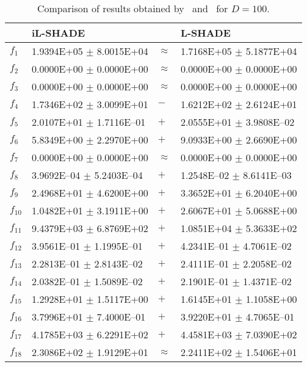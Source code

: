 \begin{table}[ht]
\centering
\caption{Comparison of results obtained by {\sf \ilshade}\ and {\sf \LSHADE}\ for $D=100$.} 
\label{tab:D100}
\begin{tabular}{|l|ll|l|}
  \hline
 & iL-SHADE &  & L-SHADE \\ 
  \hline \hline
$f_{1}$ & 1.9394E+05 $\pm$ 8.0015E+04 & $\approx$ & 1.7168E+05 $\pm$ 5.1877E+04 \\ 
  $f_{2}$ & 0.0000E+00 $\pm$ 0.0000E+00 & $\approx$ & 0.0000E+00 $\pm$ 0.0000E+00 \\ 
  $f_{3}$ & 0.0000E+00 $\pm$ 0.0000E+00 & $\approx$ & 0.0000E+00 $\pm$ 0.0000E+00 \\ 
  $f_{4}$ & 1.7346E+02 $\pm$ 3.0099E+01 & $-$ & 1.6212E+02 $\pm$ 2.6124E+01 \\ 
  $f_{5}$ & 2.0107E+01 $\pm$ 1.7116E--01 & $+$ & 2.0555E+01 $\pm$ 3.9808E--02 \\ 
  $f_{6}$ & 5.8349E+00 $\pm$ 2.2970E+00 & $+$ & 9.0933E+00 $\pm$ 2.6690E+00 \\ 
  $f_{7}$ & 0.0000E+00 $\pm$ 0.0000E+00 & $\approx$ & 0.0000E+00 $\pm$ 0.0000E+00 \\ 
  $f_{8}$ & 3.9692E--04 $\pm$ 5.2403E--04 & $+$ & 1.2548E--02 $\pm$ 8.6141E--03 \\ 
  $f_{9}$ & 2.4968E+01 $\pm$ 4.6200E+00 & $+$ & 3.3652E+01 $\pm$ 6.2040E+00 \\ 
  $f_{10}$ & 1.0482E+01 $\pm$ 3.1911E+00 & $+$ & 2.6067E+01 $\pm$ 5.0688E+00 \\ 
  $f_{11}$ & 9.4379E+03 $\pm$ 6.8769E+02 & $+$ & 1.0851E+04 $\pm$ 5.3633E+02 \\ 
  $f_{12}$ & 3.9561E--01 $\pm$ 1.1995E--01 & $+$ & 4.2341E--01 $\pm$ 4.7061E--02 \\ 
  $f_{13}$ & 2.2813E--01 $\pm$ 2.8143E--02 & $+$ & 2.4111E--01 $\pm$ 2.2058E--02 \\ 
  $f_{14}$ & 2.0382E--01 $\pm$ 1.5089E--02 & $+$ & 2.1901E--01 $\pm$ 1.4371E--02 \\ 
  $f_{15}$ & 1.2928E+01 $\pm$ 1.5117E+00 & $+$ & 1.6145E+01 $\pm$ 1.1058E+00 \\ 
  $f_{16}$ & 3.7996E+01 $\pm$ 7.4000E--01 & $+$ & 3.9220E+01 $\pm$ 4.7065E--01 \\ 
  $f_{17}$ & 4.1785E+03 $\pm$ 6.2291E+02 & $+$ & 4.4581E+03 $\pm$ 7.0390E+02 \\ 
  $f_{18}$ & 2.3086E+02 $\pm$ 1.9129E+01 & $\approx$ & 2.2411E+02 $\pm$ 1.5406E+01 \\ 

\end{tabular}
\end{table}
